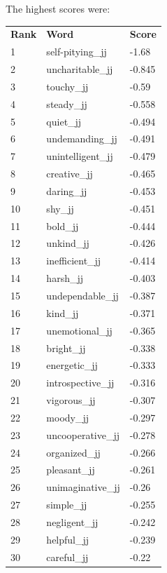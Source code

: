 \documentclass[10pt,letterpaper]{book}
\begin{document}
The highest scores were:
\begin{tabular}{ l l l }
        \textbf{Rank} & \textbf{Word} & \textbf{Score} \\
        1 & self-pitying\_jj & -1.68 \\
        2 & uncharitable\_jj & -0.845 \\
        3 & touchy\_jj & -0.59 \\
        4 & steady\_jj & -0.558 \\
        5 & quiet\_jj & -0.494 \\
        6 & undemanding\_jj & -0.491 \\
        7 & unintelligent\_jj & -0.479 \\
        8 & creative\_jj & -0.465 \\
        9 & daring\_jj & -0.453 \\
        10 & shy\_jj & -0.451 \\
        11 & bold\_jj & -0.444 \\
        12 & unkind\_jj & -0.426 \\
        13 & inefficient\_jj & -0.414 \\
        14 & harsh\_jj & -0.403 \\
        15 & undependable\_jj & -0.387 \\
        16 & kind\_jj & -0.371 \\
        17 & unemotional\_jj & -0.365 \\
        18 & bright\_jj & -0.338 \\
        19 & energetic\_jj & -0.333 \\
        20 & introspective\_jj & -0.316 \\
        21 & vigorous\_jj & -0.307 \\
        22 & moody\_jj & -0.297 \\
        23 & uncooperative\_jj & -0.278 \\
        24 & organized\_jj & -0.266 \\
        25 & pleasant\_jj & -0.261 \\
        26 & unimaginative\_jj & -0.26 \\
        27 & simple\_jj & -0.255 \\
        28 & negligent\_jj & -0.242 \\
        29 & helpful\_jj & -0.239 \\
        30 & careful\_jj & -0.22 \\
\end{tabular}
\end{document}
